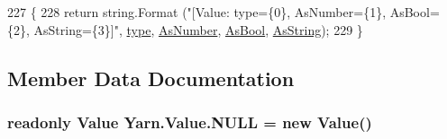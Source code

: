\begin{DoxyCode}
227         \{
228             \textcolor{keywordflow}{return} string.Format (\textcolor{stringliteral}{"[Value: type=\{0\}, AsNumber=\{1\}, AsBool=\{2\}, AsString=\{3\}]"}, 
      \hyperlink{a00161_a6d5820fafa766911b9da84d1ed33e51a}{type}, \hyperlink{a00161_a751419743761562bf902246d6e6a3c0a}{AsNumber}, \hyperlink{a00161_a5805faef3b3d376090ff096d6dd6c064}{AsBool}, \hyperlink{a00161_a2d5d0ec41c50c642c1d0eeeb6bb2b1c0}{AsString});
229         \}
\end{DoxyCode}


\subsection{Member Data Documentation}
\hypertarget{a00161_a1ed2964965baca8621c45efa23f37660}{
\subsubsection[{N\-U\-L\-L}]{\setlength{\rightskip}{0pt plus 5cm}readonly {\bf Value} Yarn.\-Value.\-N\-U\-L\-L = new {\bf Value}()\hspace{0.3cm}{\ttfamily [static]}}}\label{a00161_a1ed2964965baca8621c45efa23f37660}


